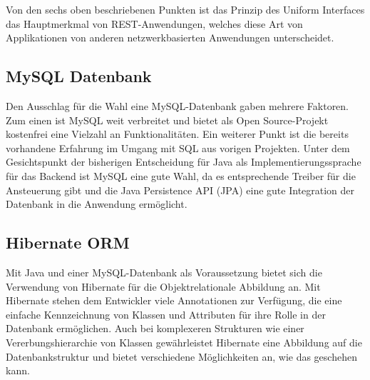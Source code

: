 Von den sechs oben beschriebenen Punkten ist das Prinzip des Uniform Interfaces das Hauptmerkmal von REST-Anwendungen, welches diese Art von Applikationen von anderen netzwerkbasierten Anwendungen unterscheidet. %


\subsection{MySQL Datenbank}
Den Ausschlag für die Wahl eine MySQL-Datenbank gaben mehrere Faktoren. Zum einen ist MySQL weit verbreitet und bietet als Open Source-Projekt kostenfrei eine Vielzahl an Funktionalitäten.
Ein weiterer Punkt ist die bereits vorhandene Erfahrung im Umgang mit SQL aus vorigen Projekten.
Unter dem Gesichtspunkt der bisherigen Entscheidung für Java als Implementierungssprache für das Backend ist MySQL eine gute Wahl, da es entsprechende Treiber für die Ansteuerung gibt und die Java Persistence API (\acs{JPA}) eine gute Integration der Datenbank in die Anwendung ermöglicht.

\subsection{Hibernate ORM}
Mit Java und einer MySQL-Datenbank als Voraussetzung bietet sich die Verwendung von Hibernate für die Objektrelationale Abbildung an.
Mit Hibernate stehen dem Entwickler viele Annotationen zur Verfügung, die eine einfache Kennzeichnung von Klassen und Attributen für ihre Rolle in der Datenbank ermöglichen.
Auch bei komplexeren Strukturen wie einer Vererbungshierarchie von Klassen gewährleistet Hibernate eine Abbildung auf die Datenbankstruktur und bietet verschiedene Möglichkeiten an, wie das geschehen kann.
